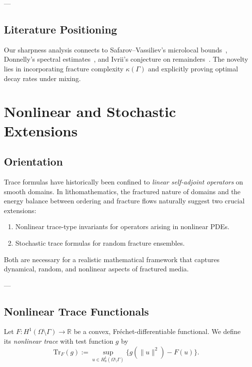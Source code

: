 ---

\subsection*{Literature Positioning}

Our sharpness analysis connects to  
Safarov–Vassiliev’s microlocal bounds~\cite{SafarovVassiliev1997},  
Donnelly’s spectral estimates~\cite{Donnelly1979},  
and Ivrii’s conjecture on remainders~\cite{Ivrii1980}.  
The novelty lies in incorporating fracture complexity $\kappa(\Gamma)$  
and explicitly proving optimal decay rates under mixing.


\section{Nonlinear and Stochastic Extensions}
\label{sec:nonlinear-stochastic}

\subsection*{Orientation}
Trace formulas have historically been confined to \emph{linear self-adjoint operators} 
on smooth domains.  
In lithomathematics, the fractured nature of domains  
and the energy balance between ordering and fracture flows  
naturally suggest two crucial extensions:
\begin{enumerate}
  \item Nonlinear trace-type invariants for operators arising in nonlinear PDEs.
  \item Stochastic trace formulas for random fracture ensembles.
\end{enumerate}
Both are necessary for a realistic mathematical framework 
that captures dynamical, random, and nonlinear aspects of fractured media.

---

\subsection{Nonlinear Trace Functionals}

\begin{definition}
Let $F: H^1(\Omega\setminus\Gamma) \to \mathbb{R}$ 
be a convex, Fréchet-differentiable functional.  
We define its \emph{nonlinear trace} with test function $g$ by
\[
\mathrm{Tr}_F(g) := \sup_{u \in H^1_0(\Omega\setminus\Gamma)} 
\Big\{ g(\|u\|^2) - F(u) \Big\}.
\]
\end{definition}


